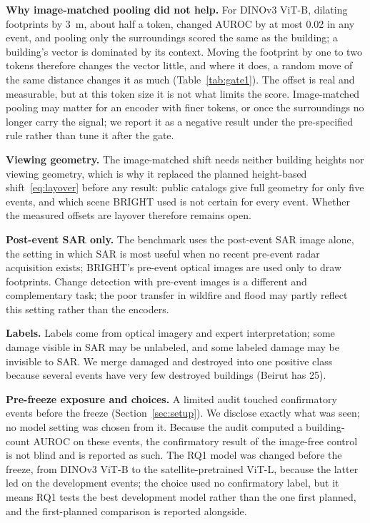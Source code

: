 \documentclass{ieeeaccess}
\begin{document}
\textbf{Why image-matched pooling did not help.} For DINOv3 ViT-B, dilating footprints by 3~m, about half a token, changed AUROC by at most 0.02 in any event, and pooling only the surroundings scored the same as the building; a building's vector is dominated by its context. Moving the footprint by one to two tokens therefore changes the vector little, and where it does, a random move of the same distance changes it as much (Table~\ref{tab:gate1}). The offset is real and measurable, but at this token size it is not what limits the score. Image-matched pooling may matter for an encoder with finer tokens, or once the surroundings no longer carry the signal; we report it as a negative result under the pre-specified rule rather than tune it after the gate.

\textbf{Viewing geometry.} The image-matched shift needs neither building heights nor viewing geometry, which is why it replaced the planned height-based shift~\eqref{eq:layover} before any result: public catalogs give full geometry for only five events, and which scene BRIGHT used is not certain for every event. Whether the measured offsets are layover therefore remains open.

\textbf{Post-event SAR only.} The benchmark uses the post-event SAR image alone, the setting in which SAR is most useful when no recent pre-event radar acquisition exists; BRIGHT's pre-event optical images are used only to draw footprints. Change detection with pre-event images is a different and complementary task; the poor transfer in wildfire and flood may partly reflect this setting rather than the encoders.

\textbf{Labels.} Labels come from optical imagery and expert interpretation; some damage visible in SAR may be unlabeled, and some labeled damage may be invisible to SAR. We merge damaged and destroyed into one positive class because several events have very few destroyed buildings (Beirut has 25).

\textbf{Pre-freeze exposure and choices.} A limited audit touched confirmatory events before the freeze (Section~\ref{sec:setup}). We disclose exactly what was seen; no model setting was chosen from it. Because the audit computed a building-count AUROC on these events, the confirmatory result of the image-free control is not blind and is reported as such. The RQ1 model was changed before the freeze, from DINOv3 ViT-B to the satellite-pretrained ViT-L, because the latter led on the development events; the choice used no confirmatory label, but it means RQ1 tests the best development model rather than the one first planned, and the first-planned comparison is reported alongside.
\end{document}
